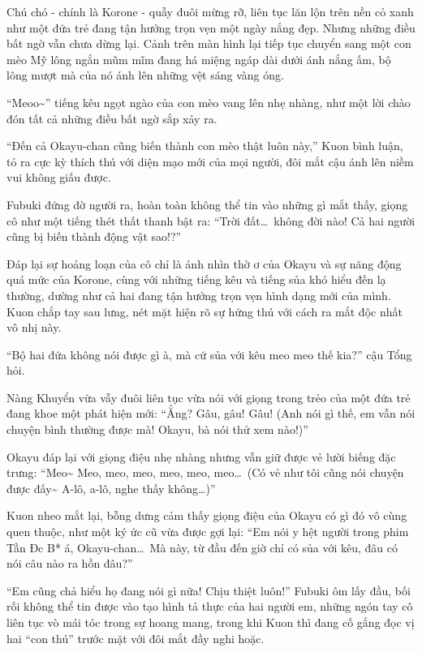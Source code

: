 \documentclass[../main.tex]{subfiles}
\begin{document}
Chú chó - chính là Korone - quẫy đuôi mừng rỡ, liên tục lăn lộn trên nền cỏ xanh như một đứa trẻ đang tận hưởng trọn vẹn một ngày nắng đẹp. Nhưng những điều bất ngờ vẫn chưa dừng lại. Cảnh trên màn hình lại tiếp tục chuyển sang một con mèo Mỹ lông ngắn mũm mĩm đang há miệng ngáp dài dưới ánh nắng ấm, bộ lông mượt mà của nó ánh lên những vệt sáng vàng óng.


``Meoo\~{}'' tiếng kêu ngọt ngào của con mèo vang lên nhẹ nhàng, như một lời chào đón tất cả những điều bất ngờ sắp xảy ra.

``Đến cả Okayu-chan cũng biến thành con mèo thật luôn này,'' Kuon bình luận, tỏ ra cực kỳ thích thú với diện mạo mới của mọi người, đôi mắt cậu ánh lên niềm vui không giấu được.

Fubuki đứng đờ người ra, hoàn toàn không thể tin vào những gì mắt thấy, giọng cô như một tiếng thét thất thanh bật ra: ``Trời đất\dots\ không đời nào! Cả hai người cũng bị biến thành động vật sao!?''

Đáp lại sự hoảng loạn của cô chỉ là ánh nhìn thờ ơ của Okayu và sự năng động quá mức của Korone, cùng với những tiếng kêu và tiếng sủa khó hiểu đến lạ thường, dường như cả hai đang tận hưởng trọn vẹn hình dạng mới của mình. Kuon chắp tay sau lưng, nét mặt hiện rõ sự hứng thú với cách ra mắt độc nhất vô nhị này.

``Bộ hai đứa không nói được gì à, mà cứ sủa với kêu meo meo thế kia?'' cậu Tổng hỏi.

Nàng Khuyển vừa vẫy đuôi liên tục vừa nói với giọng trong trẻo của một đứa trẻ đang khoe một phát hiện mới: ``Ẳng? Gâu, gâu! Gâu! (Anh nói gì thế, em vẫn nói chuyện bình thường được mà! Okayu, bà nói thử xem nào!)''

Okayu đáp lại với giọng điệu nhẹ nhàng nhưng vẫn giữ được vẻ lười biếng đặc trưng: ``Meo\~{} Meo, meo, meo, meo, meo, meo\dots\ (Có vẻ như tôi cũng nói chuyện được đấy\~{} A-lô, a-lô, nghe thấy không\dots)''

Kuon nheo mắt lại, bỗng dưng cảm thấy giọng điệu của Okayu có gì đó vô cùng quen thuộc, như một ký ức cũ vừa được gợi lại: ``Em nói y hệt người trong phim Tần Đc B* á, Okayu-chan\dots\ Mà này, từ đầu đến giờ chỉ có sủa với kêu, đâu có nói câu nào ra hồn đâu?''

``Em cũng chả hiểu họ đang nói gì nữa! Chịu thiệt luôn!'' Fubuki ôm lấy đầu, bối rối không thể tin được vào tạo hình tả thực của hai người em, những ngón tay cô liên tục vò mái tóc trong sự hoang mang, trong khi Kuon thì đang cố gắng đọc vị hai ``con thú'' trước mặt với đôi mắt đầy nghi hoặc.
\end{document}
